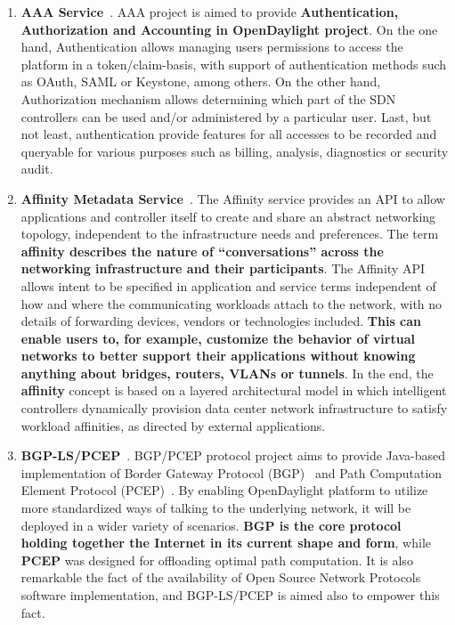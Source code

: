 \documentclass[a4paper, 12pt]{book}
\begin{document}
\begin{enumerate}
\item{\textbf{AAA Service}}~\cite{OpenDaylightWikiAAA}. AAA project is aimed to provide \textbf{Authentication, Authorization and Accounting in OpenDaylight project}. On the one hand, Authentication allows managing users permissions to access the platform in a token/claim-basis, with support of authentication methods such as OAuth, SAML or Keystone, among others. On the other hand, Authorization mechanism allows determining which part of the SDN controllers can be used and/or administered by a particular user. Last, but not least, authentication provide features for all accesses to be recorded and queryable for various purposes such as billing, analysis, diagnostics or security audit.
\item{\textbf{Affinity Metadata Service}}~\cite{OpenDaylightWikiAffinity}. The Affinity service provides an API to allow applications and controller itself to create and share an abstract networking topology, independent to the infrastructure needs and preferences. The term \textbf{affinity describes the nature of “conversations” across the networking infrastructure and their participants}. The Affinity API allows intent to be specified in application and service terms independent of how and where the communicating workloads attach to the network, with no details of forwarding devices, vendors or technologies included. \textbf{This can enable users to, for example, customize the behavior of virtual networks to better support their applications without knowing anything about bridges, routers, VLANs or tunnels}. In the end, the \textbf{affinity} concept is based on a layered architectural model in which intelligent controllers dynamically provision data center network infrastructure to satisfy workload affinities, as directed by external applications.
\item{\textbf{BGP-LS/PCEP}}~\cite{OpenDaylightWikiBGP}. BGP/PCEP protocol project aims to provide Java-based implementation of Border Gateway Protocol (BGP)~\cite{BGP} and Path Computation Element Protocol (PCEP)~\cite{PCEP}. By enabling OpenDaylight platform to utilize more standardized ways of talking to the underlying network, it will be deployed in a wider variety of scenarios. \textbf{BGP is the core protocol holding together the Internet in its current shape and form}, while \textbf{PCEP} was designed for offloading optimal path computation. It is also remarkable the fact of the availability of Open Source Network Protocols software implementation, and BGP-LS/PCEP is aimed also to empower this fact.

\end{enumerate}
\end{document}
